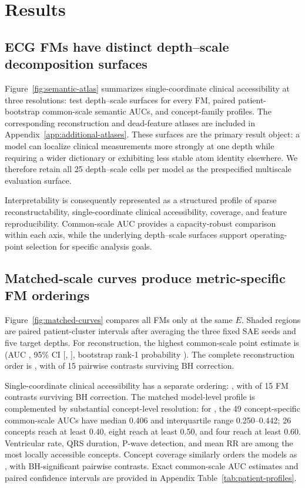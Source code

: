 \section{Results}

\subsection{ECG FMs have distinct depth--scale decomposition surfaces}

Figure~\ref{fig:semantic-atlas} summarizes single-coordinate clinical accessibility at three resolutions: test depth--scale surfaces for every FM, paired patient-bootstrap common-scale semantic AUCs, and concept-family profiles. The corresponding reconstruction and dead-feature atlases are included in Appendix~\ref{app:additional-atlases}. These surfaces are the primary result object: a model can localize clinical measurements more strongly at one depth while requiring a wider dictionary or exhibiting less stable atom identity elsewhere. We therefore retain all 25 depth--scale cells per model as the prespecified multiscale evaluation surface.

Interpretability is consequently represented as a structured profile of sparse reconstructability, single-coordinate clinical accessibility, coverage, and feature reproducibility. Common-scale AUC provides a capacity-robust comparison within each axis, while the underlying depth--scale surfaces support operating-point selection for specific analysis goals.

\subsection{Matched-scale curves produce metric-specific FM orderings}

Figure~\ref{fig:matched-curves} compares all FMs only at the same $E$. Shaded regions are paired patient-cluster intervals after averaging the three fixed SAE seeds and five target depths. For reconstruction, the highest common-scale point estimate is \MSReconTopModel{} (AUC \MSReconTopAUC{}, 95\% CI [\MSReconTopCILow{}, \MSReconTopCIHigh{}], bootstrap rank-1 probability \MSReconTopRankOne{}). The complete reconstruction order is \MSReconOrder{}, with \MSReconSignificantPairs{} of 15 pairwise contrasts surviving BH correction.

Single-coordinate clinical accessibility has a separate ordering: \MSSemanticOrder{}, with \MSSemanticSignificantPairs{} of 15 FM contrasts surviving BH correction. The matched model-level profile is complemented by substantial concept-level resolution: for \MSSemanticTopModel{}, the 49 concept-specific common-scale AUCs have median 0.406 and interquartile range 0.250--0.442; 26 concepts reach at least 0.40, eight reach at least 0.50, and four reach at least 0.60. Ventricular rate, QRS duration, P-wave detection, and mean RR are among the most locally accessible concepts. Concept coverage similarly orders the models as \MSCoverageOrder{}, with \MSCoverageSignificantPairs{} BH-significant pairwise contrasts. Exact common-scale AUC estimates and paired confidence intervals are provided in Appendix Table~\ref{tab:patient-profiles}.

